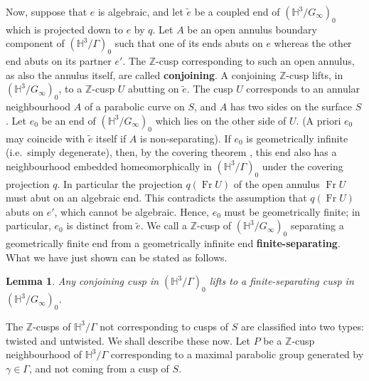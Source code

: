 \documentclass{amsart}
\newtheorem{lemma}[theorem]{Lemma}
\theoremstyle{definition}
\newcommand{\Fr}{\operatorname{Fr}}
\newcommand{\integers}{\mathbb{Z}}
\newcommand\HHH{{\mathbb H}}
\begin{document}
Now, suppose that $e$ is algebraic, and let $\tilde e$ be a coupled end of $(\HHH^3/G_\infty)_0$ which is projected down to $e$ by $q$.
Let $A$ be an open annulus boundary component of $(\HHH^3/\Gamma)_0$ such that one of its ends abuts on $e$ whereas the other end abuts on its partner $e'$.
The $\integers$-cusp corresponding to such an open annulus, as also the annulus itself, are called {\bf conjoining}.
A conjoining $\integers$-cusp  lifts, in $(\HHH^3/G_\infty)_0$,
 to a $\integers$-cusp $U$ abutting on $\tilde e$. The cusp $U$ corresponds to an annular neighbourhood $A$ of a parabolic curve on $S$, and $A$ has two sides on the surface $S$.
Let $e_0$ be an end of $(\HHH^3/G_\infty)_0$ which lies on the other side of $U$. (A priori $e_0$ may coincide with $\tilde e$ itself if $A$ is non-separating).
If $e_0$ is  geometrically infinite (i.e.\ simply degenerate), then, by the covering theorem \cite{thurstonnotes, canary-cover, OhQ}, this end also has a neighbourhood  embedded homeomorphically in $(\HHH^3/\Gamma)_0$ under the covering projection $q$.
In particular the projection $q(\Fr U)$ of the open annulus $\Fr U$ must abut on an algebraic end.
This contradicts the assumption that  $q(\Fr U)$ abuts on $e'$, which cannot be algebraic. 
Hence, $e_0$ must be geometrically finite; in particular, $e_0$ is distinct from $\tilde e$.
We call a $\integers$-cusp of $(\HHH^3/G_\infty)_0$ separating  a geometrically finite end from a geometrically infinite end {\bf finite-separating}.
What we have just shown can be stated as follows.
\begin{lemma}
Any conjoining cusp in $(\HHH^3/\Gamma)_0$ lifts to a finite-separating cusp in $(\HHH^3/G_\infty)_0$.
\end{lemma}

The $\integers$-cusps of $\HHH^3/\Gamma$ not corresponding to cusps of $S$ are classified into two types: twisted and untwisted. We shall describe these now.
Let $P$ be a $\integers$-cusp neighbourhood of $\HHH^3/\Gamma$ corresponding to a maximal parabolic group generated by  $\gamma \in \Gamma$, and  not coming from a cusp of $S$.
 
\end{document}
